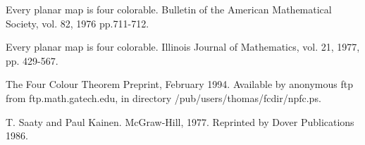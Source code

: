\Ref

            {Every planar map is four colorable.}  
            {Bulletin of the American Mathematical Society,} 
            {vol. 82, 1976 pp.711-712.}

            {Every planar map is four colorable.}
            {Illinois Journal of Mathematics,}
            {vol. 21, 1977, pp. 429-567.}


             {The Four Colour Theorem}
             {Preprint,}{ February 1994. Available by anonymous ftp 
             from ftp.math.gatech.edu, in
              directory /pub/users/thomas/fcdir/npfc.ps.  }

         {T. Saaty and Paul Kainen.}
         {McGraw-Hill, 1977. Reprinted by Dover Publications 1986.}

   

